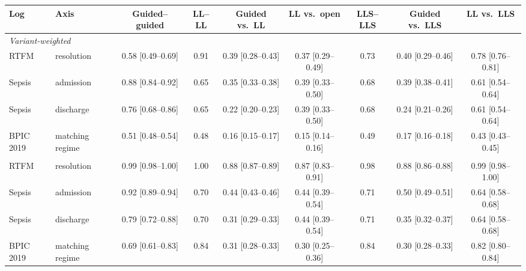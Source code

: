 \begin{tabular}{llccccccc}
\toprule
Log & Axis & Guided--guided & LL--LL & Guided vs.\ LL & LL vs.\ open & LLS--LLS & Guided vs.\ LLS & LL vs.\ LLS \\
\midrule
\multicolumn{9}{l}{\emph{Variant-weighted}} \\
RTFM & resolution & 0.58 [0.49--0.69] & 0.91 & 0.39 [0.28--0.43] & 0.37 [0.29--0.49] & 0.73 & 0.40 [0.29--0.46] & 0.78 [0.76--0.81] \\
Sepsis & admission & 0.88 [0.84--0.92] & 0.65 & 0.35 [0.33--0.38] & 0.39 [0.33--0.50] & 0.68 & 0.39 [0.38--0.41] & 0.61 [0.54--0.64] \\
Sepsis & discharge & 0.76 [0.68--0.86] & 0.65 & 0.22 [0.20--0.23] & 0.39 [0.33--0.50] & 0.68 & 0.24 [0.21--0.26] & 0.61 [0.54--0.64] \\
BPIC 2019 & matching regime & 0.51 [0.48--0.54] & 0.48 & 0.16 [0.15--0.17] & 0.15 [0.14--0.16] & 0.49 & 0.17 [0.16--0.18] & 0.43 [0.43--0.45] \\
\addlinespace
\multicolumn{9}{l}{\emph{Case-weighted}} \\
RTFM & resolution & 0.99 [0.98--1.00] & 1.00 & 0.88 [0.87--0.89] & 0.87 [0.83--0.91] & 0.98 & 0.88 [0.86--0.88] & 0.99 [0.98--1.00] \\
Sepsis & admission & 0.92 [0.89--0.94] & 0.70 & 0.44 [0.43--0.46] & 0.44 [0.39--0.54] & 0.71 & 0.50 [0.49--0.51] & 0.64 [0.58--0.68] \\
Sepsis & discharge & 0.79 [0.72--0.88] & 0.70 & 0.31 [0.29--0.33] & 0.44 [0.39--0.54] & 0.71 & 0.35 [0.32--0.37] & 0.64 [0.58--0.68] \\
BPIC 2019 & matching regime & 0.69 [0.61--0.83] & 0.84 & 0.31 [0.28--0.33] & 0.30 [0.25--0.36] & 0.84 & 0.30 [0.28--0.33] & 0.82 [0.80--0.84] \\
\bottomrule
\end{tabular}

